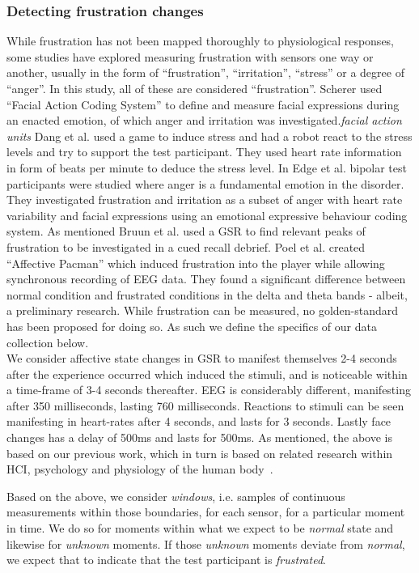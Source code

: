 \subsubsection{Detecting frustration changes}
While frustration has not been mapped thoroughly to physiological responses, some studies have explored measuring frustration with sensors one way or another, usually in the form of ``frustration'', ``irritation'', ``stress'' or a degree of ``anger''. In this study, all of these are considered ``frustration''.
Scherer used ``Facial Action Coding System'' to define and measure facial expressions during an enacted emotion, of which anger and irritation was investigated.\textit{facial action units}
Dang et al.\cite{stress_robot} used a game to induce stress and had a robot react to the stress levels and try to support the test participant. 
They used heart rate information in form of beats per minute to deduce the stress level.
In Edge et al. \cite{bipolar_frustration} bipolar test participants were studied where anger is a fundamental emotion in the disorder. 
They investigated frustration and irritation as a subset of anger with heart rate variability and facial expressions using an emotional expressive behaviour coding system. 
As mentioned Bruun et al. \cite{LH-paper} used a GSR to find relevant peaks of frustration to be investigated in a cued recall debrief. 
Poel et al. \cite{affective_pacman} created ``Affective Pacman'' which induced frustration into the player while allowing synchronous recording of EEG data. They found a significant difference between normal condition and frustrated conditions in the delta and theta bands - albeit, a preliminary research.
While frustration can be measured, no golden-standard has been proposed for doing so. 
As such we define the specifics of our data collection below.\\
We consider affective state changes in GSR to manifest themselves 2-4 seconds after the experience occurred which
induced the stimuli, and is noticeable within a time-frame of 3-4 seconds thereafter. EEG is considerably different,
manifesting after 350 milliseconds, lasting 760 milliseconds. Reactions to stimuli can be seen manifesting in heart-rates
after 4 seconds, and lasts for 3 seconds. Lastly face changes has a delay of 500ms and lasts for 500ms. As mentioned,
the above is based on our previous work, which in turn is based on related research within HCI, psychology and
physiology of the human body~\cite{9th_semester_project}.

Based on the above, we consider \textit{windows}, i.e. samples of continuous measurements within those boundaries, for
each sensor, for a particular moment in time. We do so for moments within what we expect to be \textit{normal} state and
likewise for \textit{unknown} moments. If those \textit{unknown} moments deviate from \textit{normal}, we expect that to
indicate that the test participant is \textit{frustrated}.
